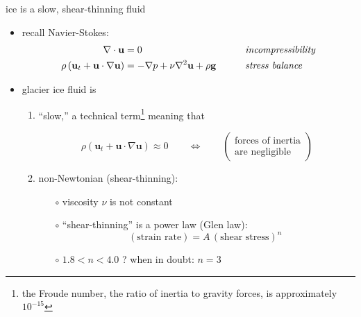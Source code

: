 \documentclass[10pt,hyperref={pdfpagelabels=true}]{beamer}
\begin{document}
\begin{frame}{ice is a slow, shear-thinning fluid}

\begin{itemize}
\item recall Navier-Stokes:
\small
\begin{align*}
\nabla \cdot \mathbf{u} &= 0 &&\qquad \text{\emph{incompressibility}} \\
\rho \left(\mathbf{u}_t + \mathbf{u}\cdot\nabla \mathbf{u}\right) &= -\nabla p + \nu \nabla^2 \mathbf{u} + \rho \mathbf{g} &&\qquad \text{\emph{stress balance}}
\end{align*}
\normalsize
\item glacier ice fluid is
  \begin{enumerate}
  \item ``slow,'' a technical term\footnote{the Froude number, the ratio of inertia to gravity forces, is approximately $10^{-15}$} meaning that

\vspace{-3mm}
    $$\rho \left(\mathbf{u}_t + \mathbf{u}\cdot\nabla \mathbf{u}\right) \approx 0 \qquad \iff \qquad \begin{pmatrix} \text{forces of inertia} \\ \text{are negligible} \end{pmatrix}$$
  \item non-Newtonian (shear-thinning):

    \begin{itemize}
    \item[$\circ$] viscosity $\nu$ is not constant
    \item[$\circ$] ``shear-thinning'' is a power law (Glen law):
        $$(\text{strain rate}) = A\, (\text{shear stress})^n$$
    \item[$\circ$] $1.8 < n < 4.0$ ?  \quad when in doubt: \alert{$n=3$}
    \end{itemize}
  \end{enumerate}
\end{itemize}
\end{frame}
\end{document}
